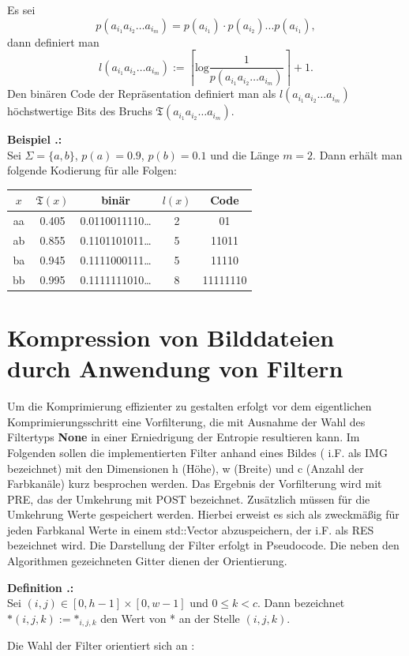 \documentclass[a4paper,12pt]{article}
\newcounter{Definition}
\newcounter{Beispiel}
\newenvironment{Definition}{
\bigskip
        
        \setlength{\parindent}{0pt}
        \addtocounter{Definition}{1}
        \textbf{\textsf{Definition \thesubsection.\theDefinition}:}\\}{
        \nopagebreak
        \vspace{-1.0ex}
        \bigskip
        
}
\newenvironment{Beispiel}{
\medskip
        
        \setlength{\parindent}{0pt}
        \addtocounter{Beispiel}{1}
        \textbf{\textsf{Beispiel \thesubsection.\theBeispiel}:}\\}{
        \nopagebreak
        \vspace{-1.0ex}
        \bigskip
        
}
\begin{document}
Es sei
$$
 p(a_{i_{1}}a_{i_{2}}\ldots a_{i_{m}}) = p(a_{i_{1}})·p(a_{i_{2}})...p(a_{i_{1}}),
$$
dann definiert man 
$$
l(a_{i_{1}}a_{i_{2}}\ldots a_{i_{m}}):=\left\lceil \text{log}\frac{1}{p(a_{i_{1}}a_{i_{2}}\ldots a_{i_{m}}) }\right\rceil + 1.
$$
Den binären Code der Repräsentation definiert man als $l(a_{i_{1}}a_{i_{2}}\ldots a_{i_{m}})$ höchstwertige Bits des Bruchs $\mathfrak{T}(a_{i_{1}}a_{i_{2}}\ldots a_{i_{m}})$. 
\begin{Beispiel}
Sei $\Sigma = \{a,b\}$, $p(a)=0.9$, $p(b)=0.1$ und die Länge $m=2$. Dann erhält man folgende Kodierung für alle Folgen:
\begin{center}
\begin{tabular}{c|c|c|c|c}
$x$ & $\mathfrak{T}(x)$ & binär & $l(x)$  & Code
\\
\hline
aa & 0.405 & 0.0110011110\ldots &  2 & 01
\\
\hline
ab & 0.855 & 0.1101101011\ldots & 5 & 11011
\\
\hline
ba & 0.945 & 0.1111000111\ldots & 5 & 11110
\\
\hline
bb & 0.995 &0.1111111010\ldots & 8 & 11111110
\end{tabular}
\end{center}
\end{Beispiel}
\newpage
\section{Kompression von Bilddateien durch Anwendung von Filtern}
Um die Komprimierung effizienter zu gestalten erfolgt vor dem eigentlichen Komprimierungsschritt eine Vorfilterung, die mit Ausnahme der Wahl des Filtertyps \textbf{None} in einer Erniedrigung der Entropie resultieren kann. Im Folgenden sollen die implementierten Filter anhand eines Bildes ( i.F. als IMG bezeichnet) mit den Dimensionen h (Höhe), w (Breite) und c (Anzahl der Farbkanäle) kurz besprochen werden. Das Ergebnis der Vorfilterung wird mit PRE, das der Umkehrung mit POST bezeichnet. Zusätzlich müssen für die Umkehrung  Werte gespeichert werden. Hierbei erweist es sich als zweckmäßig für jeden Farbkanal Werte in einem std::Vector abzuspeichern, der i.F. als RES bezeichnet wird. Die Darstellung der Filter erfolgt in Pseudocode. Die neben den Algorithmen gezeichneten Gitter dienen der Orientierung.

\begin{Definition}
Sei  $(i,j) \in [0, h-1]\times[0, w-1]$ und $0\leq k < c$.
Dann bezeichnet  $\text{*}(i,j,k):=\text{*}_{i,j,k}$ den Wert von * an der Stelle $(i,j,k)$.
\end{Definition}
Die Wahl der Filter orientiert sich an \cite{png}:
\end{document}
